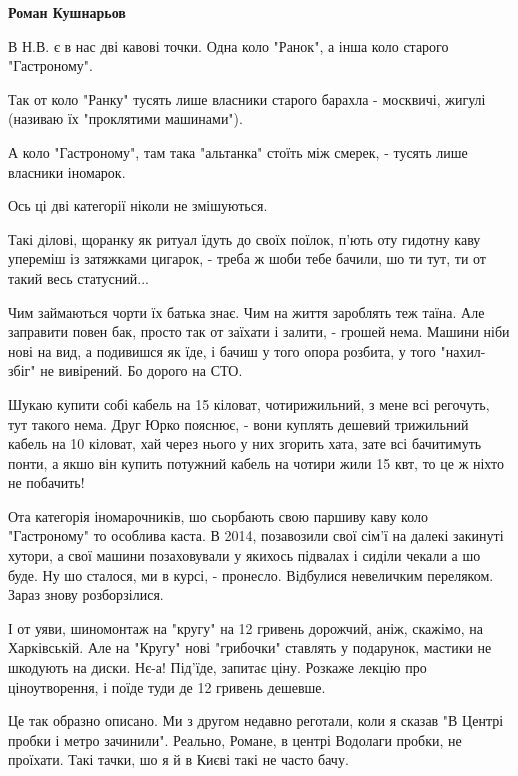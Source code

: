 \begin{itemize}
\begin{itemize}
 
\textbf{Роман Кушнарьов} 

В Н.В. є в нас дві кавові точки. Одна коло "Ранок", а інша коло старого
"Гастроному".

Так от коло "Ранку" тусять лише власники старого барахла - москвичі, жигулі
(називаю їх "проклятими машинами").

А коло "Гастроному", там така "альтанка" стоїть між смерек, - тусять лише
власники іномарок.

Ось ці дві категорії ніколи не змішуються.

Такі ділові, щоранку як ритуал їдуть до своїх поїлок, п'ють оту гидотну каву
упереміш із затяжками цигарок, - треба ж шоби тебе бачили, шо ти тут, ти от
такий весь статусний...

Чим займаються чорти їх батька знає. Чим на життя зароблять теж таїна. Але
заправити повен бак, просто так от заїхати і залити, - грошей нема. Машини ніби
нові на вид, а подивишся як їде, і бачиш у того опора розбита, у того
"нахил-збіг" не вивірений. Бо дорого на СТО. 

Шукаю купити собі кабель на 15 кіловат, чотирижильний, з мене всі регочуть, тут
такого нема. Друг Юрко пояснює, - вони куплять дешевий трижильний кабель на 10
кіловат, хай через нього у них згорить хата, зате всі бачитимуть понти, а якшо
він купить потужний кабель на чотири жили 15 квт, то це ж ніхто не побачить!

Ота категорія іномарочників, шо сьорбають свою паршиву каву коло "Гастроному"
то особлива каста. В 2014, позавозили свої сім'ї на далекі закинуті хутори, а
свої машини позаховували у якихось підвалах і сиділи чекали а шо буде. Ну шо
сталося, ми в курсі, - пронесло. Відбулися невеличким переляком. Зараз знову
розборзілися.

І от уяви, шиномонтаж на "кругу" на 12 гривень дорожчий, аніж, скажімо, на
Харківській. Але на "Кругу" нові "грибочки" ставлять у подарунок, мастики не
шкодують на диски. Нє-а! Під'їде, запитає ціну. Розкаже лекцію про
ціноутворення, і поїде туди де 12 гривень дешевше. 

Це так образно описано. Ми з другом недавно реготали, коли я сказав "В Центрі
пробки і метро зачинили". Реально, Романе, в центрі Водолаги пробки, не
проїхати. Такі тачки, шо я й в Києві такі не часто бачу.


\end{itemize}
\end{itemize}
